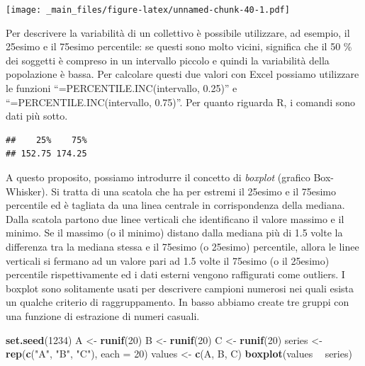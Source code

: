 \documentclass[a4paper,12pt,oneside]{book}
\newenvironment{Shaded}{\begin{snugshade}}{\end{snugshade}}
\newcommand{\KeywordTok}[1]{\textcolor[rgb]{0.13,0.29,0.53}{\textbf{#1}}}
\newcommand{\DataTypeTok}[1]{\textcolor[rgb]{0.13,0.29,0.53}{#1}}
\newcommand{\DecValTok}[1]{\textcolor[rgb]{0.00,0.00,0.81}{#1}}
\newcommand{\FloatTok}[1]{\textcolor[rgb]{0.00,0.00,0.81}{#1}}
\newcommand{\StringTok}[1]{\textcolor[rgb]{0.31,0.60,0.02}{#1}}
\newcommand{\OperatorTok}[1]{\textcolor[rgb]{0.81,0.36,0.00}{\textbf{#1}}}
\newcommand{\NormalTok}[1]{#1}
\begin{document}
\texttt{[image: \_main\_files/figure-latex/unnamed-chunk-40-1.pdf]}

Per descrivere la variabilità di un collettivo è possibile utilizzare,
ad esempio, il 25esimo e il 75esimo percentile: se questi sono molto
vicini, significa che il 50 \% dei soggetti è compreso in un intervallo
piccolo e quindi la variabilità della popolazione è bassa. Per calcolare
questi due valori con Excel possiamo utilizzare le funzioni
``=PERCENTILE.INC(intervallo, 0.25)'' e ``=PERCENTILE.INC(intervallo,
0.75)''. Per quanto riguarda R, i comandi sono dati più sotto.

\begin{Shaded}
\end{Shaded}

\begin{verbatim}
##    25%    75% 
## 152.75 174.25
\end{verbatim}

A questo proposito, possiamo introdurre il concetto di \emph{boxplot}
(grafico Box-Whisker). Si tratta di una scatola che ha per estremi il
25esimo e il 75esimo percentile ed è tagliata da una linea centrale in
corrispondenza della mediana. Dalla scatola partono due linee verticali
che identificano il valore massimo e il minimo. Se il massimo (o il
minimo) distano dalla mediana più di 1.5 volte la differenza tra la
mediana stessa e il 75esimo (o 25esimo) percentile, allora le linee
verticali si fermano ad un valore pari ad 1.5 volte il 75esimo (o il
25esimo) percentile rispettivamente ed i dati esterni vengono
raffigurati come outliers. I boxplot sono solitamente usati per
descrivere campioni numerosi nei quali esista un qualche criterio di
raggruppamento. In basso abbiamo create tre gruppi con una funzione di
estrazione di numeri casuali.

\begin{Shaded}
\begin{Highlighting}[]
\KeywordTok{set.seed}\NormalTok{(}\DecValTok{1234}\NormalTok{)}
\NormalTok{A <-}\StringTok{ }\KeywordTok{runif}\NormalTok{(}\DecValTok{20}\NormalTok{)}
\NormalTok{B <-}\StringTok{ }\KeywordTok{runif}\NormalTok{(}\DecValTok{20}\NormalTok{)}
\NormalTok{C <-}\StringTok{ }\KeywordTok{runif}\NormalTok{(}\DecValTok{20}\NormalTok{)}
\NormalTok{series <-}\StringTok{ }\KeywordTok{rep}\NormalTok{(}\KeywordTok{c}\NormalTok{(}\StringTok{"A"}\NormalTok{, }\StringTok{"B"}\NormalTok{, }\StringTok{"C"}\NormalTok{), }\DataTypeTok{each =} \DecValTok{20}\NormalTok{)}
\NormalTok{values <-}\StringTok{ }\KeywordTok{c}\NormalTok{(A, B, C)}
\KeywordTok{boxplot}\NormalTok{(values }\OperatorTok{~}\StringTok{ }\NormalTok{series)}
\end{Highlighting}
\end{Shaded}
\end{document}
